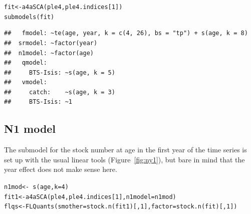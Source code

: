 \documentclass[a4paper,english,10pt]{article}\usepackage[]{graphicx}\usepackage[]{color}
\makeatletter
\newcommand{\hlnum}[1]{\textcolor[rgb]{0.063,0.58,0.627}{#1}}%
\newcommand{\hlopt}[1]{\textcolor[rgb]{0.196,0.196,0.196}{#1}}%
\newcommand{\hlstd}[1]{\textcolor[rgb]{0.196,0.196,0.196}{#1}}%
\newcommand{\hlkwb}[1]{\textcolor[rgb]{0.627,0,0.314}{#1}}%
\newcommand{\hlkwc}[1]{\textcolor[rgb]{0,0.631,0.314}{#1}}%
\newcommand{\hlkwd}[1]{\textcolor[rgb]{0.78,0.227,0.412}{#1}}%
\newenvironment{kframe}{%
 \def\at@end@of@kframe{}%
 \ifinner\ifhmode%
  \def\at@end@of@kframe{\end{minipage}}%
  \begin{minipage}{\columnwidth}%
 \fi\fi%
 \def\FrameCommand##1{\hskip\@totalleftmargin \hskip-\fboxsep
 \colorbox{shadecolor}{##1}\hskip-\fboxsep
     \hskip-\linewidth \hskip-\@totalleftmargin \hskip\columnwidth}%
 \MakeFramed {\advance\hsize-\width
   \@totalleftmargin\z@ \linewidth\hsize
   \@setminipage}}%
 {\par\unskip\endMakeFramed%
 \at@end@of@kframe}
\newenvironment{knitrout}{}{} %
\makeatother
\begin{document}
\begin{knitrout}
\color{fgcolor}\begin{kframe}
\begin{alltt}
\hlstd{fit} \hlkwb{<-} \hlkwd{a4aSCA}\hlstd{(ple4, ple4.indices[}\hlnum{1}\hlstd{])}
\hlkwd{submodels}\hlstd{(fit)}
\end{alltt}
\begin{verbatim}
## 	 fmodel: ~te(age, year, k = c(4, 26), bs = "tp") + s(age, k = 8)
## 	srmodel: ~factor(year)
## 	n1model: ~factor(age)
## 	 qmodel:
## 	   BTS-Isis: ~s(age, k = 5)
## 	 vmodel:
## 	   catch:    ~s(age, k = 3)
## 	   BTS-Isis: ~1
\end{verbatim}
\end{kframe}
\end{knitrout}

\subsection{N1 model}

The submodel for the stock number at age in the first year of the time series is set up with the usual linear tools (Figure~\ref{fig:ny1}), but bare in mind that the year effect does not make sense here.

\begin{knitrout}
\color{fgcolor}\begin{kframe}
\begin{alltt}
\hlstd{n1mod} \hlkwb{<-} \hlopt{~}\hlkwd{s}\hlstd{(age,} \hlkwc{k} \hlstd{=} \hlnum{4}\hlstd{)}
\hlstd{fit1} \hlkwb{<-} \hlkwd{a4aSCA}\hlstd{(ple4, ple4.indices[}\hlnum{1}\hlstd{],} \hlkwc{n1model} \hlstd{= n1mod)}
\hlstd{flqs} \hlkwb{<-} \hlkwd{FLQuants}\hlstd{(}\hlkwc{smother} \hlstd{=} \hlkwd{stock.n}\hlstd{(fit1)[,} \hlnum{1}\hlstd{],} \hlkwc{factor} \hlstd{=} \hlkwd{stock.n}\hlstd{(fit)[,} \hlnum{1}\hlstd{])}
\end{alltt}
\end{kframe}
\end{knitrout}
\end{document}
